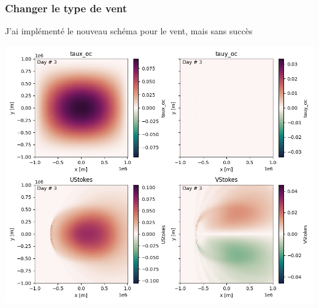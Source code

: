 \documentclass[10pt]{article}
\numberwithin{equation}{section}
\begin{document}
\subsubsection{Changer le type de vent}
\label{sec:org1ee4d13}
J'ai implémenté le nouveau schéma pour le vent, mais sans succès

\begin{center}
\includegraphics[width=.9\linewidth]{figures/debuggage/2023_10_16_ramp_tauETUstokes.png}
\end{center}




\end{document}
